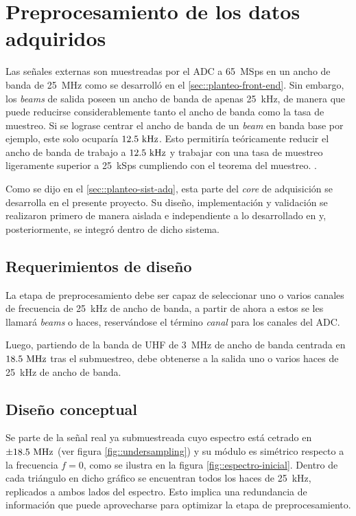 \documentclass[../../main.tex]{subfiles}
\begin{document}
\graphicspath{{./figures}}
\chapter{Preprocesamiento de los datos adquiridos}\label{cap::preproc}
Las señales externas son muestreadas por el ADC a 65~MSps en un ancho de banda de 25~MHz como se desarrolló en el \cref{sec::planteo-front-end}. Sin embargo, los \textit{beams} de salida poseen un ancho de banda de apenas 25~kHz, de manera que puede reducirse considerablemente tanto el ancho de banda como la tasa de muestreo. Si se lograse centrar el ancho de banda de un  \textit{beam} en banda base por ejemplo, este solo ocuparía $12.5~\textrm{kHz}$. Esto permitiría teóricamente reducir el ancho de banda de trabajo a $12.5~\textrm{kHz}$ y trabajar con una tasa de muestreo ligeramente superior a 25~kSps cumpliendo con el teorema del muestreo. \cite{teorema-del-muestreo}.

Como se dijo en el \cref{sec::planteo-sist-adq}, esta parte del \textit{core} de adquisición se desarrolla en el presente proyecto. Su diseño, implementación y validación se realizaron primero de manera aislada e independiente a lo desarrollado en \cite{proyecto-jose} y, posteriormente, se integró dentro de dicho sistema.

\section{Requerimientos de diseño}
La etapa de preprocesamiento debe ser capaz de seleccionar uno o varios canales de frecuencia de 25~kHz de ancho de banda, a partir de ahora a estos se les llamará \textit{beams} o haces, reservándose el término \textit{canal} para los canales del ADC.

Luego, partiendo de la banda de UHF de 3~MHz de ancho de banda centrada en $18.5~\textrm{MHz}$ tras el submuestreo, debe obtenerse a la salida uno o varios haces de 25~kHz de ancho de banda.

\section{Diseño conceptual}\label{sec::disenio-conceptual-preproc}
Se parte de la señal real ya submuestreada cuyo espectro está cetrado en $\pm 18.5~\textrm{MHz}$ (ver figura \ref{fig::undersampling}) y su módulo  es simétrico respecto a la frecuencia $f = 0$, como se ilustra en la figura \ref{fig::espectro-inicial}. Dentro de cada triángulo en dicho gráfico se encuentran todos los haces de 25~kHz, replicados a ambos lados del espectro. Esto implica una redundancia de información que puede aprovecharse para optimizar la etapa de preprocesamiento.
\end{document}
